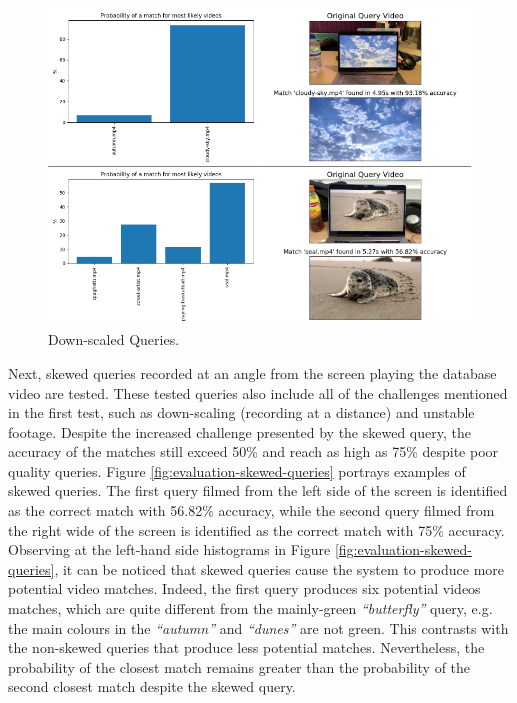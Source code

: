\begin{figure}[h] 
\centerline{\includegraphics[width=\textwidth]{figures/evaluation/downscaled-queries.png}}
\caption{\label{fig:evaluation-downscaled-queries}Down-scaled Queries.}
\end{figure}

Next, skewed queries recorded at an angle from the screen playing the database video are tested. These tested queries also include all of the challenges mentioned in the first test, such as down-scaling (recording at a distance) and unstable footage. Despite the increased challenge presented by the skewed query, the accuracy of the matches still exceed 50\% and reach as high as 75\% despite poor quality queries. Figure \ref{fig:evaluation-skewed-queries} portrays examples of skewed queries. The first query filmed from the left side of the screen is identified as the correct match with 56.82\% accuracy, while the second query filmed from the right wide of the screen is identified as the correct match with 75\% accuracy. Observing at the left-hand side histograms in Figure \ref{fig:evaluation-skewed-queries}, it can be noticed that skewed queries cause the system to produce more potential video matches. Indeed, the first query produces six potential videos matches, which are quite different from the mainly-green \textit{``butterfly''} query, e.g. the main colours in the \textit{``autumn''} and \textit{``dunes''} are not green. This contrasts with the non-skewed queries that produce less potential matches. Nevertheless, the probability of the closest match remains greater than the probability of the second closest match despite the skewed query. %


